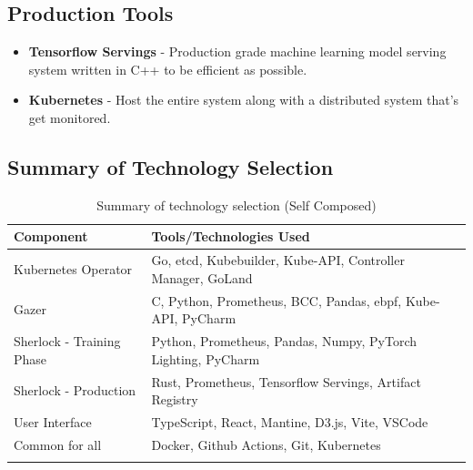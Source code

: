 \subsection{Production Tools}
\begin{itemize}
    \item \textbf{Tensorflow Servings} - Production grade machine learning model serving system written in C++ to be efficient as possible.
    \item \textbf{Kubernetes} - Host the entire system along with a distributed system that's get monitored.
\end{itemize}

\subsection{Summary of Technology Selection}

\begin{longtable}{|p{43mm}|p{110mm}|}
    \hline
    \textbf{Component} &
    \textbf{Tools/Technologies Used} \\ \hline

    Kubernetes Operator &
    Go, etcd, Kubebuilder, Kube-API, Controller Manager, GoLand \\ \hline

    Gazer &
    C, Python, Prometheus, BCC, Pandas, \ac{ebpf}, Kube-API, PyCharm \\ \hline

    Sherlock - Training Phase &
    Python, Prometheus, Pandas, Numpy, PyTorch Lighting, PyCharm \\ \hline

    Sherlock - Production &
    Rust, Prometheus, Tensorflow Servings, Artifact Registry \\ \hline

    User Interface &
    TypeScript, React, Mantine, D3.js, Vite, VSCode \\ \hline

    Common for all &
    Docker, Github Actions, Git, Kubernetes \\ \hline

    \caption{Summary of technology selection (Self Composed)}
\end{longtable}